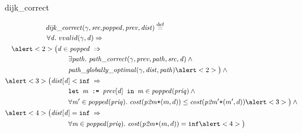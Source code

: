 \documentclass[usenames, xcolor=dvipsnames]{beamer}
\newcommand{\ifty}{\texttt{inf}}
\newcommand{\defeq}{\mathbin{\overset{\mathrm{def}}{=}}}
\newcommand{\m}[1]{\ensuremath{\mathit{#1}}} %
\begin{document}
\begin{frame}{dijk\_correct}

\begin{equation*}
\begin{split}
\m{dijk\_correct}(\gamma, \m{src}, &\m{popped}, \m{prev}, \m{dist}) \; \defeq \; \\
\forall \m{d}.~vvalid(\gamma, \m{d}) \Rightarrow \\
\alert<2>{\big( \m{d} \in \m{popped} \; \Rightarrow} \; & \\ 
& \hspace{-5em} \exists \m{path}.~\m{path\_correct}(\gamma, \m{prev}, \m{path}, \m{src}, \m{d}) \wedge \null \\
& \hspace{-5em} \m{path\_globally\_optimal}(\gamma, \m{dist}, \m{path}) \alert<2>{\big)} \wedge \null \\
\alert<3>{\big( \m{dist}[\m{d}] < \ifty \; \Rightarrow} \; & \\ 
& \hspace{-5em} \texttt{let }\m{m} \texttt{ := } \m{prev}[\m{d}] \texttt{ in } \m{m} \in \m{popped}(\m{priq}) \wedge \null \\
& \hspace{-5em} \forall \m{m'} \in \m{popped}(\m{priq}).~\m{cost}(\m{p2m} \texttt{+} (m, d)) \le \m{cost}(\m{p2m'} \texttt{+} (m', d)) \alert<3>{\big)} \wedge \null \\
\alert<4>{\big( \m{dist}[\m{d}] = \ifty \; \Rightarrow} \; & \\ 
& \hspace{-5em} \forall \m{m} \in \m{popped}(\m{priq}).~\m{cost}(\m{p2m} \texttt{+} (m, d)) = \ifty \alert<4>{\big)}
\end{split}
\end{equation*}

\end{frame}
\end{document}
